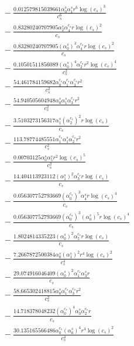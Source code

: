 \documentclass[10pt]{article}
\begin{document}
\begin{align*}
&{}  - \frac{0.012579815039661 \alpha_{0}^s \alpha_{1}^s r^{6} \log{\left(c_{s} \right)}^{3}}{c_{s}^{6}} \\
&{}  - \frac{0.83280240707905 \alpha_{2}^s \alpha_{4}^{c_s} r \log{\left(c_{s} \right)}^{2}}{c_{s}} \\
&{}  - \frac{0.83280240707905 \left(\alpha_{0}^s\right)^{3} \alpha_{4}^{c_s} r \log{\left(c_{s} \right)}^{2}}{c_{s}} \\
&{}  - \frac{0.10501511856089 \left(\alpha_{0}^s\right)^{4} \alpha_{2}^{c_s} r^{2} \log{\left(c_{s} \right)}^{4}}{c_{s}^{2}} \\
&{}  - \frac{54.461784159682 \alpha_{0}^{c_s} \alpha_{1}^{c_s} \alpha_{3}^{c_s} r^{2}}{c_{s}^{2}} \\
&{}  - \frac{54.940505604948 \alpha_{0}^s \alpha_{1}^s \alpha_{3}^{c_s} r^{2}}{c_{s}^{2}} \\
&{}  - \frac{3.5103273156317 \alpha_{1}^s \left(\alpha_{2}^{c_s}\right)^{2} r \log{\left(c_{s} \right)}}{c_{s}} \\
&{}  - \frac{113.78774485551 \alpha_{1}^{c_s} \alpha_{1}^s \alpha_{2}^{c_s} r^{2}}{c_{s}^{2}} \\
&{}  - \frac{0.00703125 \alpha_{0}^s \alpha_{5}^s r^{2} \log{\left(c_{s} \right)}^{5}}{c_{s}^{2}} \\
&{}  - \frac{14.404113923112 \left(\alpha_{1}^s\right)^{2} \alpha_{3}^{c_s} r \log{\left(c_{s} \right)}}{c_{s}} \\
&{}  - \frac{0.056307752793669 \left(\alpha_{0}^{c_s}\right)^{3} \alpha_{4}^s r \log{\left(c_{s} \right)}^{4}}{c_{s}} \\
&{}  - \frac{0.056307752793669 \left(\alpha_{0}^{c_s}\right)^{3} \left(\alpha_{0}^s\right)^{5} r \log{\left(c_{s} \right)}^{4}}{c_{s}} \\
&{}  - \frac{1.8024814335223 \left(\alpha_{0}^s\right)^{2} \alpha_{5}^{c_s} r \log{\left(c_{s} \right)}}{c_{s}} \\
&{}  - \frac{7.2667872500384 \alpha_{0}^s \left(\alpha_{1}^s\right)^{2} r^{4} \log{\left(c_{s} \right)}^{2}}{c_{s}^{4}} \\
&{}  - \frac{29.074916046409 \left(\alpha_{0}^s\right)^{2} \alpha_{1}^{c_s} \alpha_{3}^s r}{c_{s}} \\
&{}  - \frac{58.665302418815 \alpha_{0}^s \alpha_{1}^{c_s} \alpha_{3}^{c_s} r^{2}}{c_{s}^{2}} \\
&{}  - \frac{14.718378048232 \left(\alpha_{0}^{c_s}\right)^{4} \alpha_{0}^s \alpha_{2}^{c_s} r}{c_{s}} \\
&{}  - \frac{30.135165566486 \alpha_{0}^{c_s} \left(\alpha_{0}^s\right)^{4} r^{4} \log{\left(c_{s} \right)}^{2}}{c_{s}^{4}} \\

\end{align*}
\end{document}
